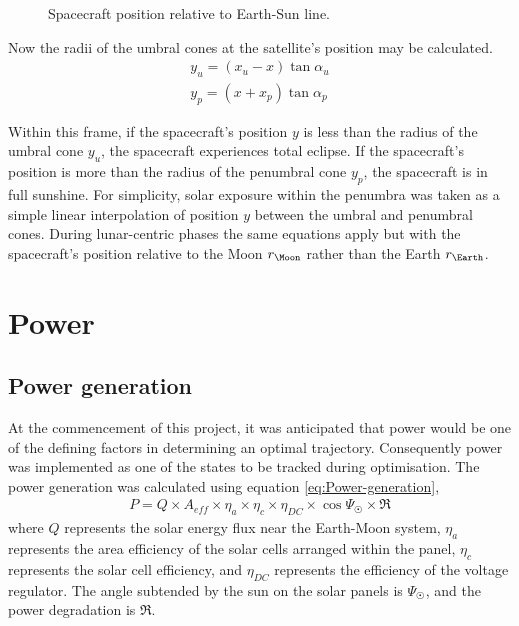 \begin{figure}
\caption{Spacecraft position relative to Earth-Sun line.}
\label{fig:Spacecraft-shadow}
\centering
\def\svgwidth{\figurewidth}
\end{figure}

Now the radii of the umbral cones at the satellite's position may be calculated.
\begin{subequations}
\begin{gather}
y_u = (x_u-x)\tan\alpha_u \\
y_p = (x+x_p)\tan\alpha_p
\end{gather}
\end{subequations}

Within this frame, if the spacecraft's position $y$ is less than the radius of the umbral cone $y_u$, the spacecraft experiences total eclipse. If the spacecraft's position is more than the radius of the penumbral cone $y_p$, the spacecraft is in full sunshine. For simplicity, solar exposure within the penumbra was taken as a simple linear interpolation of position $y$ between the umbral and penumbral cones. During lunar-centric phases the same equations apply but with the spacecraft's position relative to the Moon $r_\Moon$ rather than the Earth $r_\Earth$.


\section{Power}\label{sec:Vehicle-power}

\subsection{Power generation} \label{sub:Power-generation}

At the commencement of this project, it was anticipated that power would be one of the defining factors in determining an optimal trajectory. Consequently power was implemented as one of the states to be tracked during optimisation. The power generation was calculated using equation \eqref{eq:Power-generation},
\begin{gather} \label{eq:Power-generation}
P = Q\times A_{eff}\times\eta_a\times\eta_c\times\eta_{DC}\times\cos\Psi_\Sun\times\mathfrak{R}
\end{gather}
where $Q$ represents the solar energy flux near the Earth-Moon system, $\eta_a$ represents the area efficiency of the solar cells arranged within the panel, $\eta_c$ represents the solar cell efficiency, and $\eta_{DC}$ represents the efficiency of the voltage regulator. The angle subtended by the sun on the solar panels is $\Psi_\Sun$, and the power degradation is $\mathfrak{R}$.

